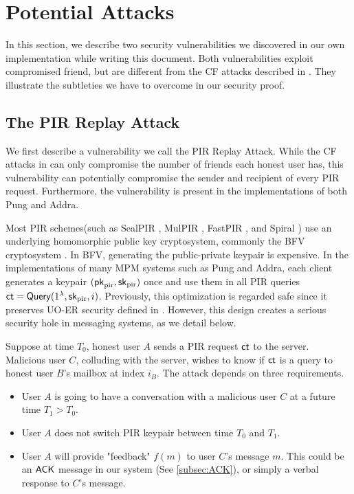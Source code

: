 \section{Potential Attacks}
\label{sec:security-vulnerable}

In this section, we describe two security vulnerabilities we discovered in our own implementation while writing this document. Both vulnerabilities exploit compromised friend, but are different from the CF attacks described in \cite{angel2018cf}. They illustrate the subtleties we have to overcome in our security proof.

\subsection{The PIR Replay Attack}
We first describe a vulnerability we call the PIR Replay Attack. While the CF attacks in \cite{angel2018cf} can only compromise the number of friends each honest user has, this vulnerability can potentially compromise the sender and recipient of every PIR request. Furthermore, the vulnerability is present in the implementations of both Pung and Addra.

Most PIR schemes(such as SealPIR \cite{angel2018pir}, MulPIR \cite{ali2021communicationcomputation}, FastPIR \cite{ahmad2021addra}, and Spiral \cite{wu2022spiral}) use an underlying homomorphic public key cryptosystem, commonly the BFV cryptosystem \cite{fan2012somewhat}. In BFV, generating the public-private keypair is expensive. In the implementations of many MPM systems such as Pung and Addra, each client generates a keypair $(\mathsf{pk}_{\text{pir}}, {\mathsf{sk}}_{\text{pir}})$ once and use them in all PIR queries $\mathsf{ct} = \mathsf{Query}(1^{\lambda}, {\mathsf{sk}}_{\text{pir}}, i)$. Previously, this optimization is regarded safe since it preserves UO-ER security defined in \cite[Extended Version]{angel2016unobservable}. However, this design creates a serious security hole in messaging systems, as we detail below.

Suppose at time $T_0$, honest user $A$ sends a PIR request $\mathsf{ct}$ to the server. Malicious user $C$, colluding with the server, wishes to know if $\mathsf{ct}$ is a query to honest user $B$'s mailbox at index $i_B$. The attack depends on three requirements.
\begin{itemize}
    \item User $A$ is going to have a conversation with a malicious user $C$ at a future time $T_1 > T_0$. 
    \item User $A$ does not switch PIR keypair between time $T_0$ and $T_1$.
    \item User $A$ will provide "feedback" $f(m)$ to user $C$'s message $m$. This could be an $\mathsf{ACK}$ message in our system (See \cref{subsec:ACK}), or simply a verbal response to $C$'s message.  
\end{itemize}

